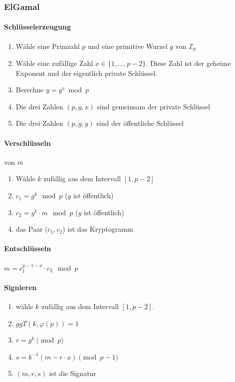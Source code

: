 \documentclass[8pt,a4paper,landscape]{article}
\begin{document}
\begin{multicols}{4}
\subsubsection{ElGamal}
\paragraph{Schlüsselerzeugung}
\begin{enumerate}[itemsep=1pt] 
    \item Wähle eine Primzahl $p$ und eine primitive Wurzel $g$ von
          $\mathbb{Z}_{p}$
    \item Wähle eine zufällige Zahl $x \in \{1, \dots, p-2\}$. Diese
          Zahl ist der geheime Exponent und der eigentlich private Schlüssel.
    \item Berechne $y = g^x \bmod p$
    \item Die drei Zahlen $(p,g,x)$ sind gemeinsam der private Schlüssel
    \item Die drei Zahlen $(p,g,y)$ sind der öffentliche Schlüssel
\end{enumerate}
\paragraph{Verschlüsseln} von $m$
\begin{enumerate}[itemsep=1pt] 
    \item Wähle $k$ zufällig aus dem Intervall $[1, p-2]$
    \item $c_{1} = g^{k} \mod p$ ($g$ ist öffentlich)
    \item $c_{2} = y^{k} \cdot m \mod p$ ($y$ ist öffentlich)
    \item das Paar ($c_{1}, c_{2}$) ist das Kryptogramm
\end{enumerate}
\paragraph{Entschlüsseln} $m = c_{1}^{p-1-x} \cdot c_{2} \mod p$
\paragraph{Signieren} 
\begin{enumerate}[itemsep=1pt] 
    \item wähle $k$ zufällig aus dem Intervall $[1, p-2]$. 
    \item $ggT(k, \varphi(p)) = 1$
    \item $r = g^k \pmod {p}$
    \item $s = k^{-1}(m - r \cdot x) \pmod {p-1}$
    \item $(m, r, s)$ ist die Signatur
\end{enumerate}


\end{multicols}
\end{document}
